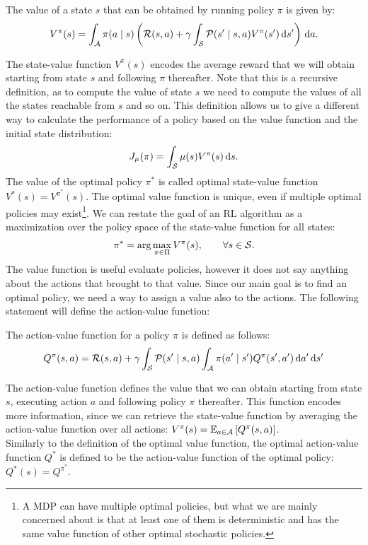 \begin{definition}
The value of a state $s$ that can be obtained by running policy $\pi$ is given by:
\[
V^{\pi}(s) = \int_{\aspace} \pi(a \mid s) \left( \rfunc(s,a) + \gamma \int_{\sspace} \tfunc(s' \mid s, a) V^{\pi} (s') \de s' \right) \de a.
\]
\end{definition}

The state-value function $V^\pi(s)$ encodes the average reward that we will obtain starting from state $s$ and following $\pi$ thereafter. Note that this is a recursive definition, as to compute the value of state $s$ we need to compute the values of all the states reachable from $s$ and so on. This definition allows us to give a different way to calculate the performance of a policy based on the value function and the initial state distribution:
\[
J_\mu(\pi) = \int_{\sspace}\mu(s)V^\pi(s)\de s.
\]
The value of the optimal policy $\pi^*$ is called optimal state-value function $V^*(s) = V^{\pi^*}(s)$. The optimal value function is unique, even if multiple optimal policies may exist\footnote{A MDP can have multiple optimal policies, but what we are mainly concerned about is that at least one of them is deterministic and has the same value function of other optimal stochastic policies.}. We can restate the goal of an RL algorithm as a maximization over the policy space of the state-value function for all states:
\[
\pi^* = \arg\max_{\pi \in \Pi} V^\pi(s),\qquad \forall s \in \sspace.
\]
The value function is useful evaluate policies, however it does not say anything about the actions that brought to that value. Since our main goal is to find an optimal policy, we need a way to assign a value also to the actions. The following statement will define the action-value function:

\begin{definition}
The action-value function for a policy $\pi$ is defined as follows:
\[
Q^{\pi}(s, a) = \rfunc(s, a) + \gamma \int_{\sspace} \tfunc (s' \mid s, a) \int_{\aspace} \pi(a' \mid s') Q^{\pi} (s', a') \de a' \de s'
\]
\end{definition}

The action-value function defines the value that we can obtain starting from state $s$, executing action $a$ and following policy $\pi$ thereafter. This function encodes more information, since we can retrieve the state-value function by averaging the action-value function over all actions: $V^\pi(s) = \EV[a\in\aspace]{Q^\pi(s,a)}$. \\
Similarly to the definition of the optimal value function, the optimal action-value function $Q^*$ is defined to be the action-value function of the optimal policy: $Q^*(s) = Q^{\pi^*}$. 

